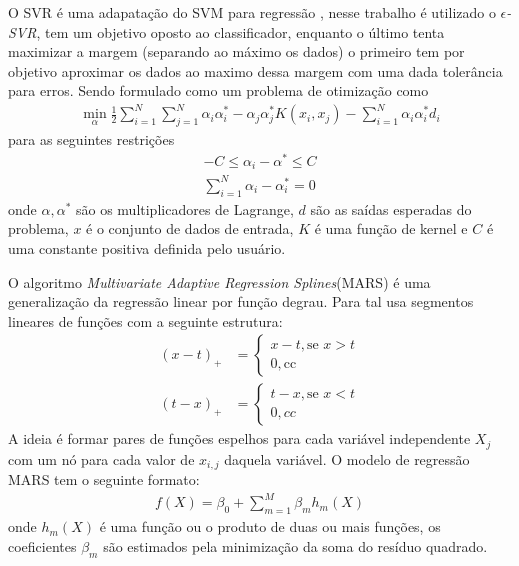 \documentclass{acm_proc_article-sp}
\begin{document}
O SVR é uma adapatação do SVM para regress{\~a}o , nesse trabalho {\'e} utilizado o \emph{\(\epsilon\)-SVR}, tem um objetivo oposto ao classificador, enquanto o {\'u}ltimo tenta maximizar a margem (separando ao m{\'a}ximo os dados) o primeiro tem por objetivo aproximar os dados ao maximo dessa margem com uma dada toler{\^a}ncia para erros. Sendo formulado como um problema de otimiza\c{c}{\~a}o \cite{Haykin2007} como
\begin{align}
\min_{\alpha} \frac{1}{2} \sum\limits_{i=1}^{N} \sum\limits_{j=1}^{N} \alpha_{i}\alpha^{*}_{i} - \alpha_{j}\alpha^{*}_{j} K(x_{i},x_{j}) - \sum\limits_{i=1}^{N} \alpha_{i}\alpha^{*}_{i}d_{i}
\end{align}
para as seguintes restri\c{c}{\~o}es
\begin{align}
-C \leq \alpha_{i} - \alpha^{*} \leq C \\
 \sum\limits_{i=1}^{N} \alpha_{i} - \alpha^{*}_{i} = 0
\end{align}
onde \(\alpha, \alpha^{*}\) s{\~a}o os multiplicadores de Lagrange, \(d\) s{\~a}o as sa{\'i}das esperadas do problema, \(x\) {\'e} o conjunto de dados de entrada, \(K\) {\'e} uma fun\c{c}{\~a}o de kernel e \(C\) {\'e} uma constante positiva definida pelo usu{\'a}rio.

O algoritmo \emph{Multivariate Adaptive Regression Splines}(MARS)  {\'e} uma generaliza\c{c}{\~a}o da regress{\~a}o linear por fun\c{c}{\~a}o degrau\cite{Hastie2009}. Para tal usa segmentos lineares de fun\c{c}{\~o}es com a seguinte estrutura:
\begin{align}
(x-t)_{+} &= \begin{cases}
x-t, \mbox{se } x>t \\
0,   \mbox{cc}
\end{cases}
\\
(t-x)_{+} &= \begin{cases}
t-x, \mbox{se } x<t \\
0, cc
\end{cases} 
\end{align}
A ideia {\'e} formar pares de fun\c{c}{\~o}es espelhos para cada vari{\'a}vel independente \(X_{j}\) com um n{\'o} para cada valor de \(x_{i,j}\) daquela vari{\'a}vel. O modelo de regress{\~a}o MARS tem o seguinte formato:
\begin{align}
f(X) = \beta_{0} + \sum\limits_{m=1}^{M}\beta_{m}h_{m}(X)
\end{align}
onde \(h_{m}(X)\) {\'e} uma fun\c{c}{\~a}o ou o produto de duas ou mais fun\c{c}{\~o}es, os coeficientes \(\beta_{m}\) s{\~a}o estimados pela minimiza\c{c}{\~a}o da soma do res{\'i}duo quadrado.
\end{document}
